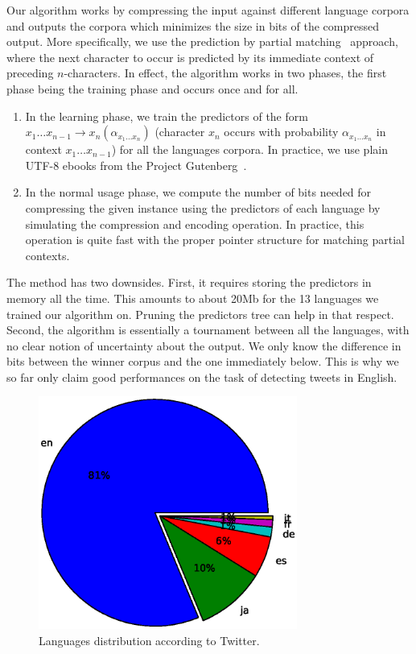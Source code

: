 \documentclass[times, 11pt, twocolumn]{article}
\begin{document}
Our algorithm works by compressing the input against different language corpora and outputs the corpora which minimizes
the size in bits of the compressed output. More specifically, we use the prediction by partial matching~\cite{Cleary1984} approach, where 
the next character to occur is predicted by its immediate context of preceding $n$-characters. In effect, the algorithm 
works in two phases, the first phase being the training phase and occurs once and for all.
\begin{enumerate}
	\item In the learning phase, we train the predictors of the form $x_1\dots x_{n-1} \rightarrow x_n (\alpha_{x_1 \dots x_n})$
		(character $x_n$ occurs with probability $ \alpha_{x_1 \dots x_n}$ in context $x_1\dots x_{n-1}$) for all the languages
		corpora. In practice, we use plain UTF-8 ebooks from the Project Gutenberg~\cite{Gutenberg}.
	\item In the normal usage phase, we compute the number of bits needed for compressing the given instance using the predictors 
		of each language by simulating the compression and encoding operation. In practice, this operation is quite fast 
		with the proper pointer structure for matching partial contexts.
\end{enumerate}
The method has two downsides. First, it requires storing the predictors in memory all the time. This amounts to about 20Mb for the 13 
languages we trained our algorithm on. Pruning the predictors tree can help in that respect. Second, the algorithm is essentially a 
tournament between all the languages, with no clear notion of uncertainty about the output. We only know the difference in bits 
between the winner corpus and the one immediately below. This is why we so far only claim good performances on the task of 
detecting tweets in English.

\begin{figure}[!h]\centering
	\includegraphics[width=8.5cm]{lang_twitter.eps}
	\caption{Languages distribution according to Twitter.}
	\label{tw_lang}
\end{figure}
\end{document}

